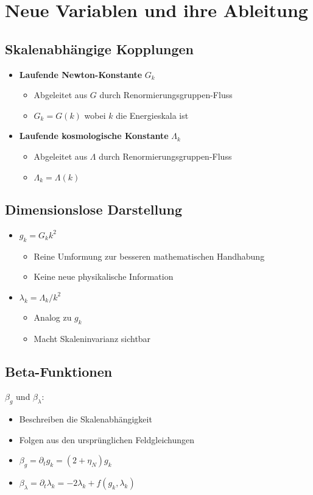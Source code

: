 \documentclass{article}
\begin{document}
	\section{Neue Variablen und ihre Ableitung}
	
	\subsection{Skalenabhängige Kopplungen}
	\begin{itemize}
		\item \textbf{Laufende Newton-Konstante} $G_k$
		\begin{itemize}
			\item Abgeleitet aus $G$ durch Renormierungsgruppen-Fluss
			\item $G_k = G(k)$ wobei $k$ die Energieskala ist
		\end{itemize}
		
		\item \textbf{Laufende kosmologische Konstante} $\Lambda_k$
		\begin{itemize}
			\item Abgeleitet aus $\Lambda$ durch Renormierungsgruppen-Fluss
			\item $\Lambda_k = \Lambda(k)$
		\end{itemize}
	\end{itemize}
	
	\subsection{Dimensionslose Darstellung}
	\begin{itemize}
		\item $g_k = G_k k^2$
		\begin{itemize}
			\item Reine Umformung zur besseren mathematischen Handhabung
			\item Keine neue physikalische Information
		\end{itemize}
		
		\item $\lambda_k = \Lambda_k/k^2$
		\begin{itemize}
			\item Analog zu $g_k$
			\item Macht Skaleninvarianz sichtbar
		\end{itemize}
	\end{itemize}
	
	\subsection{Beta-Funktionen}
	$\beta_g$ und $\beta_\lambda$:
	\begin{itemize}
		\item Beschreiben die Skalenabhängigkeit
		\item Folgen aus den ursprünglichen Feldgleichungen
		\item $\beta_g = \partial_t g_k = (2 + \eta_N)g_k$
		\item $\beta_\lambda = \partial_t \lambda_k = -2\lambda_k + f(g_k,\lambda_k)$
	\end{itemize}
	
\end{document}
